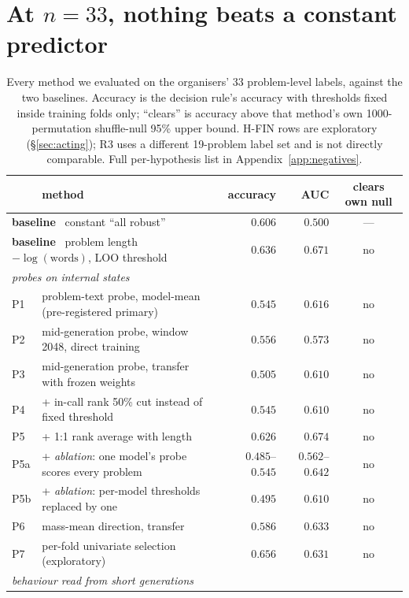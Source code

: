 \documentclass[10pt]{article}
\providecommand{\texorpdfstring}[2]{#1}
\begin{document}
\section{At \texorpdfstring{$n{=}33$}{n=33}, nothing beats a constant predictor}
\label{sec:power}
\begin{table}[t]
\centering\scriptsize
\caption{Every method we evaluated on the organisers' 33 problem-level labels, against the two
baselines. Accuracy is the decision rule's accuracy with thresholds fixed inside training folds
only; ``clears'' is accuracy above that method's own 1000-permutation shuffle-null 95\% upper bound.
H-FIN rows are exploratory (\S\ref{sec:acting}); R3 uses a different 19-problem label set and is not
directly comparable. Full per-hypothesis list in Appendix~\ref{app:negatives}.}
\label{tab:honest}
\begin{tabular}{llrrc}
\toprule
 & method & accuracy & AUC & clears own null \\
\midrule
\multicolumn{2}{l}{\textbf{baseline} \ constant ``all robust''} & $\mathbf{0.606}$ & $0.500$ & --- \\
\multicolumn{2}{l}{\textbf{baseline} \ problem length $-\log(\text{words})$, LOO threshold} & $\mathbf{0.636}$ & $0.671$ & no \\
\midrule
\multicolumn{5}{l}{\emph{probes on internal states}} \\
P1 & problem-text probe, model-mean (pre-registered primary) & $0.545$ & $0.616$ & no \\
P2 & mid-generation probe, window 2048, direct training & $0.556$ & $0.573$ & no \\
P3 & mid-generation probe, transfer with frozen weights & $0.505$ & $0.610$ & no \\
P4 & \;+ in-call rank 50\% cut instead of fixed threshold & $0.545$ & $0.610$ & no \\
P5 & \;+ 1:1 rank average with length & $0.626$ & $0.674$ & no \\
P5a & \;+ \emph{ablation}: one model's probe scores every problem & $0.485$--$0.545$ & $0.562$--$0.642$ & no \\
P5b & \;+ \emph{ablation}: per-model thresholds replaced by one & $0.495$ & $0.610$ & no \\
P6 & mass-mean direction, transfer & $0.586$ & $0.633$ & no \\
P7 & per-fold univariate selection (exploratory) & $0.656$ & $0.631$ & no \\
\midrule
\multicolumn{5}{l}{\emph{behaviour read from short generations}} \\

\end{tabular}
\end{table}
\end{document}
